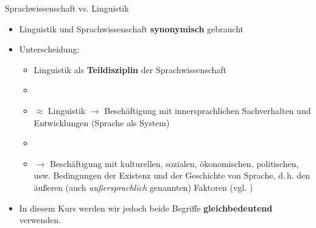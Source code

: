 \begin{frame}{Sprachwissenschaft vs. Linguistik}

	\begin{itemize}
		\item<1-> Linguistik und Sprachwissenschaft \idR \textbf{synonymisch} gebraucht
		\item<2-> Unterscheidung:
		
		\begin{itemize}
			\item<2-> Linguistik als \textbf{Teildisziplin} der Sprachwissenschaft
			\item[]
			\item<3->  $\approx$ Linguistik $\rightarrow$ Beschäftigung mit innersprachlichen Sachverhalten und Entwicklungen (Sprache als System)
			\item[]
			\item<4->  $\rightarrow$ Beschäftigung mit kulturellen, sozialen, ökonomischen, politischen, usw. Bedingungen der Existenz und der Geschichte von Sprache, d.\,h. den äußeren (auch \textit{außersprachlich} genannten) Faktoren (vgl. \citealp{Glueck05a})
		\end{itemize}
		
		\item<5-> In diesem Kurs werden wir jedoch beide Begriffe \textbf{gleichbedeutend} verwenden.
	\end{itemize}
	
\end{frame}



